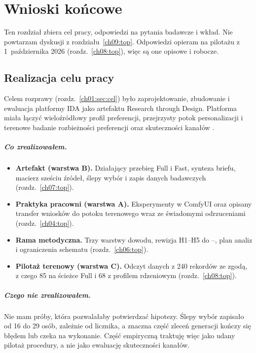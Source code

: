 \chapter{Wnioski końcowe}
\label{ch10:top}

Ten rozdział zbiera cel pracy, odpowiedzi na pytania badawcze i wkład. Nie powtarzam dyskusji z rozdziału~\ref{ch09:top}. Odpowiedzi opieram na pilotażu z 1~października 2026 (rozdz.~\ref{ch08:top}), więc są one opisowe i robocze.

\section{Realizacja celu pracy}
\label{ch10:sec:cel}

Celem rozprawy (rozdz.~\ref{ch01:sec:cel}) było zaprojektowanie, zbudowanie i ewaluacja platformy IDA jako artefaktu Research through Design. Platforma miała łączyć wieloźródłowy profil preferencji, przejrzysty potok personalizacji i terenowe badanie rozbieżności preferencji oraz skuteczności kanałów \parencite{idaPlatform2026}.

\paragraph{Co zrealizowałem.}
\begin{itemize}
  \item \textbf{Artefakt (warstwa B).} Działający przebieg Full i Fast, synteza briefu, macierz sześciu źródeł, ślepy wybór i zapis danych badawczych (rozdz.~\ref{ch07:top}).
  \item \textbf{Praktyka pracowni (warstwa A).} Eksperymenty w ComfyUI oraz opisany transfer wniosków do potoku terenowego wraz ze świadomymi odrzuceniami (rozdz.~\ref{ch04:top}).
  \item \textbf{Rama metodyczna.} Trzy warstwy dowodu, rewizja H1--H5 do --, plan analiz i ograniczenia schematu (rozdz.~\ref{ch06:top}).
  \item \textbf{Pilotaż terenowy (warstwa C).} Odczyt danych z 240 rekordów ze zgodą, z czego 85 na ścieżce Full i 68 z profilem rdzeniowym (rozdz.~\ref{ch08:top}).
\end{itemize}

\paragraph{Czego nie zrealizowałem.}
Nie mam próby, która pozwalałaby potwierdzać hipotezy. Ślepy wybór zapisało od 16 do 29 osób, zależnie od licznika, a znaczna część zleceń generacji kończy się błędem lub czeka na wykonanie. Część empiryczną traktuję więc jako udany pilotaż procedury, a nie jako ewaluację skuteczności kanałów.

